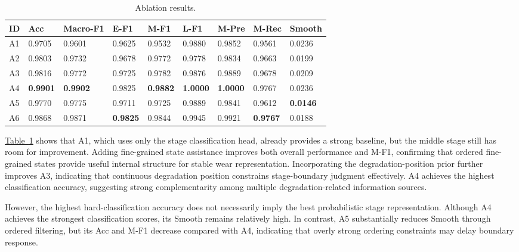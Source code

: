 \documentclass[a4paper,fleqn]{cas-sc}
\providecommand{\tabref}{}
\renewcommand{\tabref}[1]{\hyperref[#1]{Table~\ref*{#1}}}
\begin{document}
  \begin{table}[!htbp]
    \centering
    \scriptsize
  \caption{Ablation results.}
    \label{tab:12}
    \begin{adjustbox}{max width=\textwidth}
      \begin{tabular}{lllllllll}
        \toprule
        \textbf{ID} & \textbf{Acc} & \textbf{Macro-F1} & \textbf{E-F1} & \textbf{M-F1} & \textbf{L-F1} & \textbf{M-Pre} & \textbf{M-Rec} & \textbf{Smooth} \\
        \midrule
        A1 & 0.9705 & 0.9601 & 0.9625 & 0.9532 & 0.9880 & 0.9852 & 0.9561 & 0.0236 \\
        A2 & 0.9803 & 0.9732 & 0.9678 & 0.9772 & 0.9778 & 0.9834 & 0.9663 & 0.0199 \\
        A3 & 0.9816 & 0.9772 & 0.9725 & 0.9782 & 0.9876 & 0.9889 & 0.9678 & 0.0209 \\
        A4 & \textbf{0.9901} & \textbf{0.9902} & 0.9825 & \textbf{0.9882} & \textbf{1.0000} & \textbf{1.0000} & 0.9767 & 0.0236 \\
        A5 & 0.9770 & 0.9775 & 0.9711 & 0.9725 & 0.9889 & 0.9841 & 0.9612 & \textbf{0.0146} \\
        A6 & 0.9868 & 0.9871 & \textbf{0.9825} & 0.9844 & 0.9945 & 0.9921 & \textbf{0.9767} & 0.0188 \\
        \bottomrule
      \end{tabular}
    \end{adjustbox}
  \end{table}
  \tabref{tab:12} shows that A1, which uses only the stage classification head, already provides a strong baseline, but the middle stage still has room for improvement. Adding fine-grained state assistance improves both overall performance and M-F1, confirming that ordered fine-grained states provide useful internal structure for stable wear representation. Incorporating the degradation-position prior further improves A3, indicating that continuous degradation position constrains stage-boundary judgment effectively. A4 achieves the highest classification accuracy, suggesting strong complementarity among multiple degradation-related information sources.

  However, the highest hard-classification accuracy does not necessarily imply the best probabilistic stage representation. Although A4 achieves the strongest classification scores, its Smooth remains relatively high. In contrast, A5 substantially reduces Smooth through ordered filtering, but its Acc and M-F1 decrease compared with A4, indicating that overly strong ordering constraints may delay boundary response.
\end{document}
